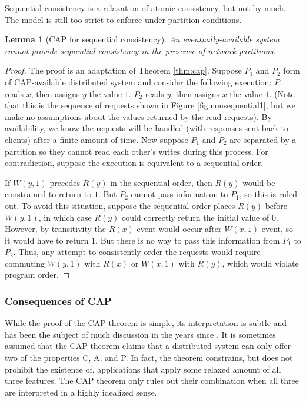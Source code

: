 \documentclass[]             %
{NASA}                       %
\newtheorem{lemma}[theorem]{Lemma}
\theoremstyle{definition}
\begin{document}
Sequential consistency is a relaxation of atomic consistency, but not by
much. The model is still too strict to enforce under partition
conditions.

\begin{lemma}[CAP for sequential consistency]
  \label{thm:cap-sequential}
  An eventually-available system cannot provide sequential consistency in the presense of network partitions.
\end{lemma}
\begin{proof}

  The proof is an adaptation of Theorem \ref{thm:cap}. Suppose $P_1$ and
  $P_2$ form of CAP-available distributed system and consider the
  following execution: $P_1$ reads $x$, then assigns $y$ the value
  $1$. $P_2$ reads $y$, then assigns $x$ the value $1$. (Note that this
  is the sequence of requests shown in Figure \ref{fig:nonsequential1},
  but we make no assumptions about the values returned by the read
  requests). By availability, we know the requests will be handled (with
  responses sent back to clients) after a finite amount of time. Now
  suppose $P_1$ and $P_2$ are separated by a partition so they cannot
  read each other's writes during this process. For contradiction,
  suppose the execution is equivalent to a sequential order.

  If $W(y,1)$ precedes $R(y)$ in the sequential order, then $R(y)$ would
  be constrained to return to $1$. But $P_2$ cannot pass information to
  $P_1$, so this is ruled out. To avoid this situation, suppose the
  sequential order places $R(y)$ before $W(y,1)$, in which case $R(y)$
  could correctly return the initial value of $0$. However, by
  transitivity the $R(x)$ event would occur after $W(x,1)$ event, so it
  would have to return $1$. But there is no way to pass this information
  from $P_1$ to $P_2$. Thus, any attempt to consistently order the
  requests would require commuting $W(y,1)$ with $R(x)$ or $W(x,1)$ with
  $R(y)$, which would violate program order.
\end{proof}


\subsubsection{Consequences of CAP}
\label{interpretation-of-the-cap-theorem}

While the proof of the CAP theorem is simple, its interpretation is
subtle and has been the subject of much discussion in the years since
\cite{2012CAP12Years}. It is sometimes assumed that the CAP theorem claims that
a distributed system can only offer two of the properties C, A, and P.
In fact, the theorem constrains, but does not prohibit the existence of,
applications that apply some relaxed amount of all three features. The
CAP theorem only rules out their combination when all three are
interpreted in a highly idealized sense.
\end{document}
